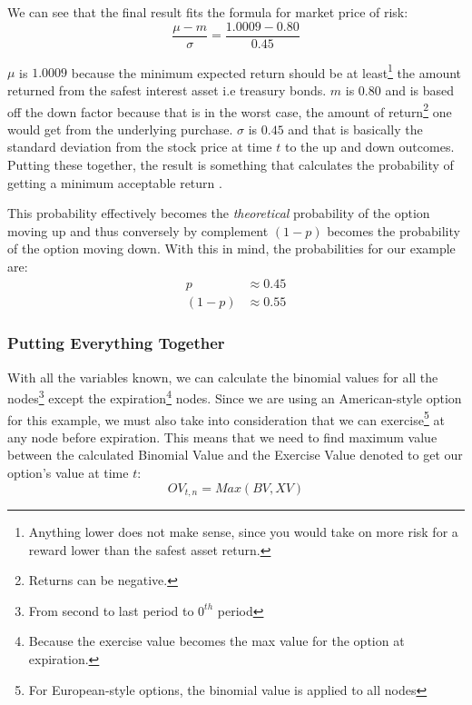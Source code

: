 \documentclass[12pt, letterpaper]{article}\usepackage{float}
\begin{document}
We can see that the final result fits the formula for market price of risk:
\begin{equation*}
  \frac{\mu - m}{\sigma} = \frac{1.0009 - 0.80}{0.45}
\end{equation*}

\noindent ${\mu}$ is ${1.0009}$ because the minimum expected return should be at least\footnote{Anything lower does not make sense, since you would take on more risk for a reward lower than the safest asset return.} the amount returned from the safest interest asset i.e treasury bonds. ${m}$ is ${0.80}$ and is based off the down factor because that is in the worst case, the amount of return\footnote{Returns can be negative.} one would get from the underlying purchase. ${\sigma}$ is ${0.45}$ and that is basically the standard deviation from the stock price at time ${t}$ to the up and down outcomes. Putting these together, the result is something that calculates the probability of getting a minimum acceptable return \cite{sfratioinvestopedia}.

\medskip

This probability effectively becomes the \textit{theoretical} probability of the option moving up and thus conversely by complement ${(1-p)}$ becomes the probability of the option moving down. With this in mind, the probabilities for our example are:
\begin{align*}
  p
  & \approx 0.45 \\
  (1-p)
  & \approx 0.55
\end{align*}

\pagebreak
\subsubsection*{Putting Everything Together}
With all the variables known, we can calculate the binomial values for all the nodes\footnote{From second to last period to ${0^{th}}$ period} except the expiration\footnote{Because the exercise value becomes the max value for the option at expiration.} nodes.
Since we are using an American-style option for this example, we must also take into consideration that we can exercise\footnote{For European-style options, the binomial value is applied to all nodes\cite{bopmwikipedia}} at any node before expiration.
This means that we need to find maximum value between the calculated Binomial Value and the Exercise Value denoted\cite{bopmwikipedia} to get our option's value at time ${t}$:
\begin{equation*}
  OV_{t,n} = Max({BV, XV})
\end{equation*}
\end{document}
